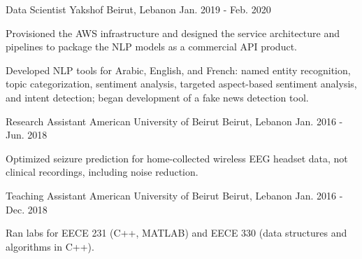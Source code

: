 \begin{cventries}
  \cventry
    {Data Scientist} %
    {Yakshof} %
    {Beirut, Lebanon} %
    {Jan. 2019 - Feb. 2020} %
    {
      \begin{cvitems} %
        \item {Provisioned the AWS infrastructure and designed the service architecture and pipelines to package the NLP models as a commercial API product.}
        \item {Developed NLP tools for Arabic, English, and French: named entity recognition, topic categorization, sentiment analysis, targeted \mbox{aspect-based} sentiment analysis, and intent detection; began development of a fake news detection tool.}
      \end{cvitems}
    }

  \cventry
    {Research Assistant} %
    {American University of Beirut} %
    {Beirut, Lebanon} %
    {Jan. 2016 - Jun. 2018} %
    {
      \begin{cvitems} %
        \item {Optimized seizure prediction for home-collected wireless EEG headset data, not clinical recordings, including noise reduction.}
      \end{cvitems}
    }

  \cventry
    {Teaching Assistant} %
    {American University of Beirut} %
    {Beirut, Lebanon} %
    {Jan. 2016 - Dec. 2018} %
    {
      \begin{cvitems} %
        \item {Ran labs for EECE 231 (C++, MATLAB) and EECE 330 (data structures and algorithms in C++).}
      \end{cvitems}
    }


\end{cventries}
